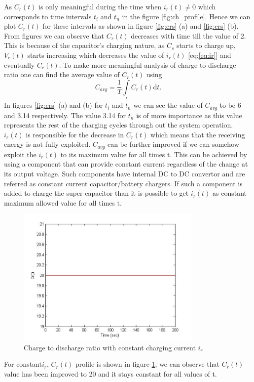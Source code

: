 As $C_r(t)$ is only meaningful during the time when $i_r(t) \neq 0$ which corresponds to time intervals $t_i$ and $t_n$ in the figure \ref{fig:ch_profile}. Hence we can plot $C_r(t)$ for these intervals as shown in figure \ref{fig:crs} (a) and \ref{fig:crs} (b). From figures we can observe that $ C_r(t)$ decreases with time till the value of 2. This is because of the capacitor's charging nature, as $C_s$ starts to charge up,$ V_c(t)$ starts increasing which decreases the value of $ i_r(t)$ [eq:\ref{eq:ir}] and eventually $C_r(t)$. 
To make more meaningful analysis of charge to discharge ratio one can find the average value of $C_r(t)$ using
\begin{equation}\label{eq:cravg}
C_{avg} = \frac{1}{T}\int\limits_t C_r(t) \mathrm{d}t.
\end{equation}
In figures \ref{fig:crs} (a) and (b) for $t_i$ and $t_n$ we can see the value of $ C_{avg}$ to be 6 and 3.14 respectively. The value 3.14 for $t_n$ is of more importance as this value represents the rest of the charging cycles through out the system operation. $i_r(t)$ is responsible for the decrease in $C_r(t)$ which means that the receiving energy is not fully exploited. $C_{avg}$ can be further improved if we can somehow exploit the $i_r(t)$ to its maximum value for all times t. This can be achieved by using a component that can provide constant current regardless of the change at its output voltage. Such components have internal DC to DC convertor and are referred as constant current capacitor/battery chargers. If such a component is added to charge the super capacitor than it is possible to get $i_r(t)$ as constant maximum allowed value for all times t.

\begin{figure}[h!]
\centering
\includegraphics[width=0.8\textwidth]{ctd2c.pdf}
\caption{Charge to discharge ratio with constant charging current $i_r$}
\label{fig:crconst}
\end{figure}

 For constant$ i_r$, $C_r(t)$ profile is shown in figure \ref{fig:crconst}, we can observe that $C_r(t)$ value has been improved to 20 and it stays constant for all values of t.
